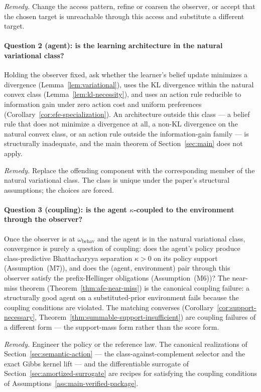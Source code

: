 \emph{Remedy.} Change the access pattern, refine or coarsen the observer, or accept that the chosen target is unreachable through this access and substitute a different target.

\paragraph{Question 2 (agent): is the learning architecture in the natural variational class?}
Holding the observer fixed, ask whether the learner's belief update minimizes a divergence (Lemma~\ref{lem:variational}), uses the KL divergence within the natural convex class (Lemma~\ref{lem:kl-necessity}), and uses an action rule reducible to information gain under zero action cost and uniform preferences (Corollary~\ref{cor:efe-specialization}). An architecture outside this class --- a belief rule that does not minimize a divergence at all, a non-KL divergence on the natural convex class, or an action rule outside the information-gain family --- is structurally inadequate, and the main theorem of Section~\ref{sec:main} does not apply.

\emph{Remedy.} Replace the offending component with the corresponding member of the natural variational class. The class is unique under the paper's structural assumptions; the choices are forced.

\paragraph{Question 3 (coupling): is the agent $\kappa$-coupled to the environment through the observer?}
Once the observer is at $\omega_{\mathrm{behav}}$ and the agent is in the natural variational class, convergence is purely a question of coupling: does the agent's policy produce class-predictive Bhattacharyya separation $\kappa>0$ on its policy support (Assumption~\textup{(M7)}), and does the (agent, environment) pair through this observer satisfy the prefix-Hellinger obligations (Assumption~\textup{(M6)})? The near-miss theorem (Theorem~\ref{thm:afe-near-miss}) is the canonical coupling failure: a structurally good agent on a substituted-prior environment fails because the coupling conditions are violated. The matching converses (Corollary~\ref{cor:support-necessary}, Theorem~\ref{thm:summable-support-insufficient}) are coupling failures of a different form --- the support-mass form rather than the score form.

\emph{Remedy.} Engineer the policy or the reference law. The canonical realizations of Section~\ref{sec:semantic-action} --- the class-against-complement selector and the exact Gibbs kernel lift --- and the differentiable surrogate of Section~\ref{sec:amortized-surrogate} are recipes for satisfying the coupling conditions of Assumptions~\ref{ass:main-verified-package}.

